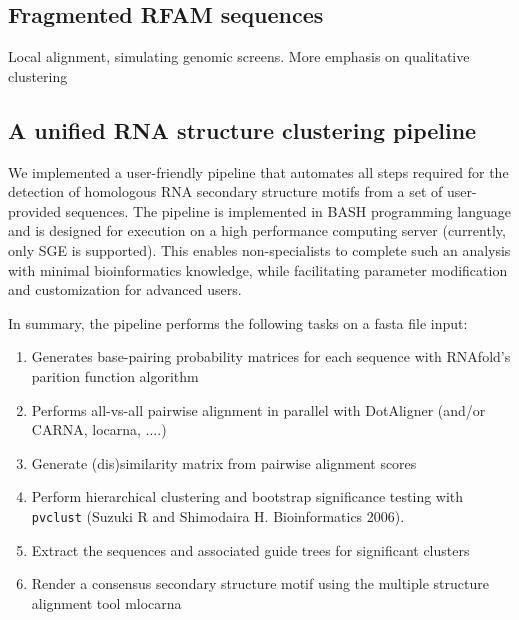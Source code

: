 \documentclass[a4paper,twoside]{article}
\newcommand\dotaligner{\texttt{DotAligner}}
\newcommand\pvclust{\texttt{pvclust}}
\newcommand{\GRAY}[1]{\textcolor{mygray}{#1}}
\begin{document}
\begin{figure*}[!ht]
  \centering
  {}
  \caption{\GRAY{Automated hierarchical clustering of 300 sequences from 10 H/ACA
  snoRNA families. The dissimilarity matrix was calculated through \dotaligner{}
  with gap penalty 4. The clustering was conducted by the R-package \pvclust{}
  with multiscale bootstrap resampling with number of bootstrap 1000. We define
  clusters (red rectangles) as Approximately Unbiased (AU) \textit{p}-values $>$
  0.95 rejecting the hypothesis that ``the cluster does not exist`` with
  significance level 0.05.}}
  \label{fig:dotaligner_g4_cluster}
\end{figure*}


\subsection{Fragmented RFAM sequences} 

Local alignment, simulating genomic screens. More emphasis on qualitative clustering


\subsection{ A unified RNA structure clustering pipeline }

\noindent We implemented a user-friendly pipeline that automates all steps required 
for the detection of homologous RNA secondary structure motifs from a set of user-
provided sequences. The pipeline is implemented in BASH programming language and is 
designed for execution on a high performance computing server (currently, only SGE 
is supported). This enables non-specialists to complete such an analysis with 
minimal bioinformatics knowledge, while facilitating parameter modification and 
customization for advanced users. 

In summary, the pipeline performs the following tasks on a fasta file input:
\begin{enumerate}
\item Generates base-pairing probability matrices for each sequence with RNAfold's parition function algorithm 
\item Performs all-vs-all pairwise alignment in parallel with DotAligner (and/or CARNA, locarna, ....)
\item Generate (dis)similarity matrix from pairwise alignment scores 
\item Perform hierarchical clustering and bootstrap significance testing with \pvclust{} (Suzuki R and Shimodaira H. Bioinformatics 2006).
\item Extract the sequences and associated guide trees for significant clusters
\item Render a consensus secondary structure motif using the multiple structure alignment tool mlocarna
\end{enumerate}
\end{document}
